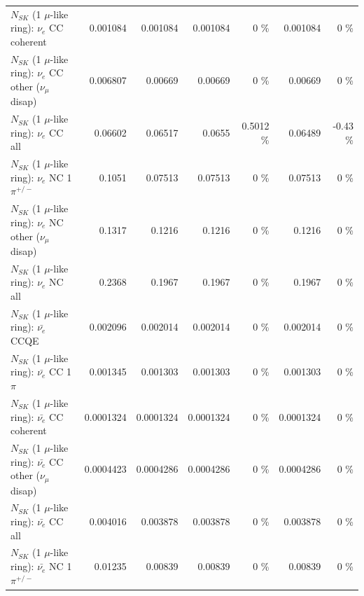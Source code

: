\begin{table}
\begin{tabular}{| l | r | r | r  r | r  r |}
                               $N_{SK}$ (1 $\mu$-like ring): $\nu_e$ CC coherent &        0.001084 &        0.001084 &        0.001084 &        0 \%  &        0.001084 &        0 \%  \\ 
                $N_{SK}$ (1 $\mu$-like ring): $\nu_e$ CC other ($\nu_\mu$ disap) &        0.006807 &         0.00669 &         0.00669 &        0 \%  &         0.00669 &        0 \%  \\ 
                                  $N_{SK}$ (1 $\mu$-like ring): $\nu_{e}$ CC all &         0.06602 &         0.06517 &          0.0655 &   0.5012 \%  &         0.06489 &    -0.43 \%  \\ 
\hline
                           $N_{SK}$ (1 $\mu$-like ring): $\nu_e$ NC 1$\pi^{+/-}$ &          0.1051 &         0.07513 &         0.07513 &        0 \%  &         0.07513 &        0 \%  \\ 
                $N_{SK}$ (1 $\mu$-like ring): $\nu_e$ NC other ($\nu_\mu$ disap) &          0.1317 &          0.1216 &          0.1216 &        0 \%  &          0.1216 &        0 \%  \\ 
                                  $N_{SK}$ (1 $\mu$-like ring): $\nu_{e}$ NC all &          0.2368 &          0.1967 &          0.1967 &        0 \%  &          0.1967 &        0 \%  \\ 
\hline
\hline
\hline
                                $N_{SK}$ (1 $\mu$-like ring): $\bar{\nu_e}$ CCQE &        0.002096 &        0.002014 &        0.002014 &        0 \%  &        0.002014 &        0 \%  \\ 
                           $N_{SK}$ (1 $\mu$-like ring): $\bar{\nu_e}$ CC 1$\pi$ &        0.001345 &        0.001303 &        0.001303 &        0 \%  &        0.001303 &        0 \%  \\ 
                         $N_{SK}$ (1 $\mu$-like ring): $\bar{\nu_e}$ CC coherent &       0.0001324 &       0.0001324 &       0.0001324 &        0 \%  &       0.0001324 &        0 \%  \\ 
          $N_{SK}$ (1 $\mu$-like ring): $\bar{\nu_e}$ CC other ($\nu_\mu$ disap) &       0.0004423 &       0.0004286 &       0.0004286 &        0 \%  &       0.0004286 &        0 \%  \\ 
                            $N_{SK}$ (1 $\mu$-like ring): $\bar{\nu_{e}}$ CC all &        0.004016 &        0.003878 &        0.003878 &        0 \%  &        0.003878 &        0 \%  \\ 
\hline
                     $N_{SK}$ (1 $\mu$-like ring): $\bar{\nu_e}$ NC 1$\pi^{+/-}$ &         0.01235 &         0.00839 &         0.00839 &        0 \%  &         0.00839 &        0 \%  \\ 

\end{tabular}
\end{table}

